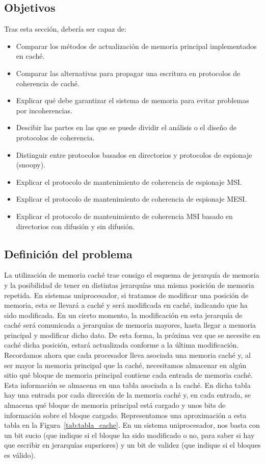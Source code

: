\subsection{Objetivos}
Tras esta sección, debería ser capaz de:
\begin{itemize}
    \item Comparar los métodos de actualización de memoria principal implementados en caché.
    \item Comparar las alternativas para propagar una escritura en protocolos de coherencia de caché.
    \item Explicar qué debe garantizar el sistema de memoria para evitar problemas por incoherencias.
    \item Descibir las partes en las que se puede dividir el análisis o el diseño de protocolos de coherencia.
    \item Distinguir entre protocolos basados en directorios y protocolos de espionaje (snoopy).
    \item Explicar el protocolo de mantenimiento de coherencia de espionaje MSI\@.
    \item Explicar el protocolo de mantenimiento de coherencia de espionaje MESI\@.
    \item Explicar el protocolo de mantenimiento de coherencia MSI basado en directorios con difusión y sin difusión.
\end{itemize}

\subsection{Definición del problema}
La utilización de memoria caché trae consigo el esquema de jerarquía de memoria y la posibilidad de tener en distintas jerarquías una misma posición de memoria repetida. En sistemas uniprocesador, si tratamos de modificar una posición de memoria, esta se llevará a caché y será modificada en caché, indicando que ha sido modificada. En un cierto momento, la modificación en esta jerarquía de caché será comunicada a jerarquías de memoria mayores, hasta llegar a memoria principal y modificar dicho dato. De esta forma, la próxima vez que se necesite en caché dicha posición, estará actualizada conforme a la última modificación.\\

Recordamos ahora que cada procesador lleva asociada una memoria caché y, al ser mayor la memoria principal que la caché, necesitamos almacenar en algún sitio qué bloque de memoria principal contiene cada entrada de memoria caché. Esta información se almacena en una tabla asociada a la caché. En dicha tabla hay una entrada por cada dirección de la memoria caché y, en cada entrada, se almacena qué bloque de memoria principal está cargado y unos bits de información sobre el bloque cargado. Representamos una aproximación a esta tabla en la Figura~\ref{tab:tabla_cache}. En un sistema uniprocesador, nos basta con un bit sucio (que indique si el bloque ha sido modificado o no, para saber si hay que escribir en jerarquías supsriores) y un bit de validez (que indique si el bloques es válido).\\

